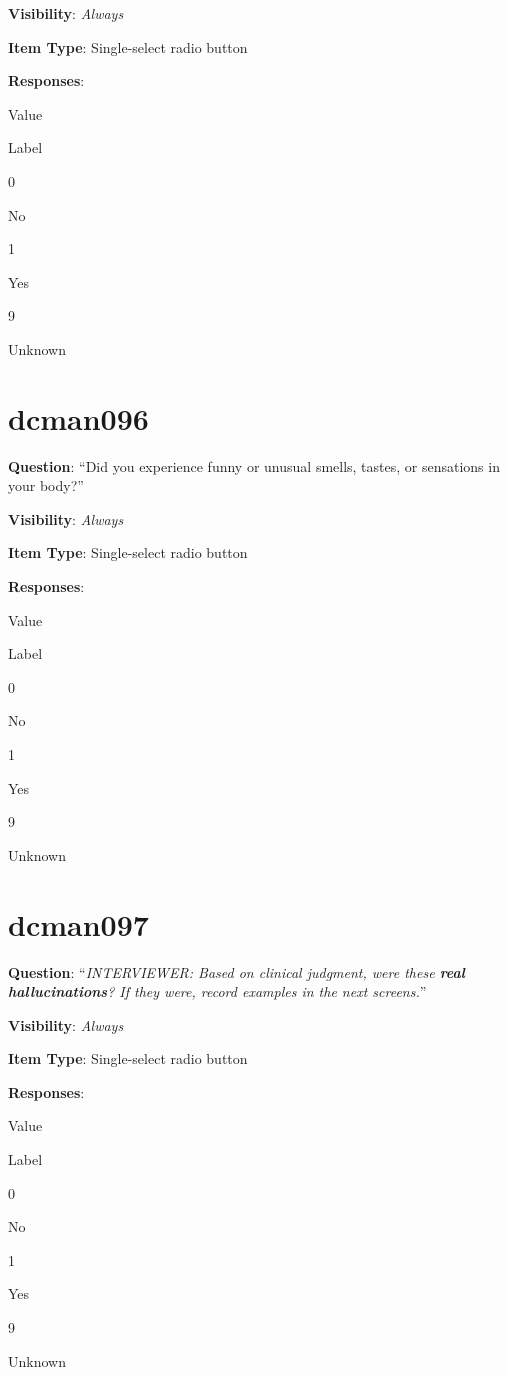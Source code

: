 \documentclass[]{book}
\begin{document}
\textbf{Visibility}: \emph{Always}

\textbf{Item Type}: Single-select radio button

\textbf{Responses}:

Value

Label

0

No

1

Yes

9

Unknown

\hypertarget{dcman096}{%
\section{dcman096}\label{dcman096}}

\textbf{Question}: ``Did you experience funny or unusual smells, tastes, or sensations in your body?''

\textbf{Visibility}: \emph{Always}

\textbf{Item Type}: Single-select radio button

\textbf{Responses}:

Value

Label

0

No

1

Yes

9

Unknown

\hypertarget{dcman097}{%
\section{dcman097}\label{dcman097}}

\textbf{Question}: ``\emph{INTERVIEWER: Based on clinical judgment, were these \textbf{real hallucinations}? If they were, record examples in the next screens.}''

\textbf{Visibility}: \emph{Always}

\textbf{Item Type}: Single-select radio button

\textbf{Responses}:

Value

Label

0

No

1

Yes

9

Unknown
\end{document}
